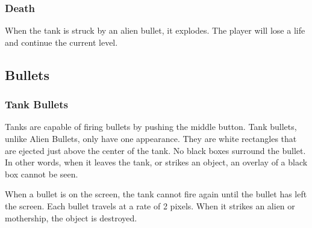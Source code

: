 \documentclass[11pt,letter,oneside]{report}
\begin{document}
\subsubsection{Death}
When the tank is struck by an alien bullet, it explodes.  The player will lose a life and continue the current level.

\subsection{Bullets}
\subsubsection{Tank Bullets}
Tanks are capable of firing bullets by pushing the middle button. Tank bullets, unlike Alien Bullets, only have one appearance. They are white rectangles that are ejected just above the center of the tank. No black boxes surround the bullet. In other words, when it leaves the tank, or strikes an object, an overlay of a black box cannot be seen. 

When a bullet is on the screen, the tank cannot fire again until the bullet has left the screen. Each bullet travels at a rate of 2 pixels. When it strikes an alien or mothership, the object is destroyed.
\end{document}
